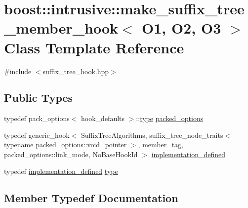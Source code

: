 \hypertarget{classboost_1_1intrusive_1_1make__suffix__tree__member__hook}{}\section{boost\+:\+:intrusive\+:\+:make\+\_\+suffix\+\_\+tree\+\_\+member\+\_\+hook$<$ O1, O2, O3 $>$ Class Template Reference}
\label{classboost_1_1intrusive_1_1make__suffix__tree__member__hook}


{\ttfamily \#include $<$suffix\+\_\+tree\+\_\+hook.\+hpp$>$}

\subsection*{Public Types}
\begin{DoxyCompactItemize}
\item 
typedef pack\+\_\+options$<$ hook\+\_\+defaults $>$\+::\hyperlink{classboost_1_1intrusive_1_1make__suffix__tree__member__hook_ad60aeb75c91f8af7d26f667cecb0b8d9}{type} \hyperlink{classboost_1_1intrusive_1_1make__suffix__tree__member__hook_a2a13362c40f5ef968999753023916ccb}{packed\+\_\+options}
\item 
typedef generic\+\_\+hook$<$ Suffix\+Tree\+Algorithms, suffix\+\_\+tree\+\_\+node\+\_\+traits$<$ typename packed\+\_\+options\+::void\+\_\+pointer $>$, member\+\_\+tag, packed\+\_\+options\+::link\+\_\+mode, No\+Base\+Hook\+Id $>$ \hyperlink{classboost_1_1intrusive_1_1make__suffix__tree__member__hook_a933f8ac391dbd99a5f61386b58a04d60}{implementation\+\_\+defined}
\item 
typedef \hyperlink{classboost_1_1intrusive_1_1make__suffix__tree__member__hook_a933f8ac391dbd99a5f61386b58a04d60}{implementation\+\_\+defined} \hyperlink{classboost_1_1intrusive_1_1make__suffix__tree__member__hook_ad60aeb75c91f8af7d26f667cecb0b8d9}{type}
\end{DoxyCompactItemize}


\subsection{Member Typedef Documentation}
\mbox{\label{classboost_1_1intrusive_1_1make__suffix__tree__member__hook_a933f8ac391dbd99a5f61386b58a04d60}} 
